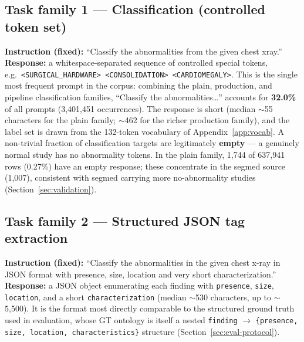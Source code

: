 \documentclass[11pt,a4paper]{article}
\begin{document}
\subsection{Task family 1 --- Classification (controlled token set)}
\textbf{Instruction (fixed):} ``Classify the abnormalities from the given chest xray.'' \textbf{Response:} a whitespace-separated sequence of controlled special tokens, e.g.\ \texttt{<SURGICAL\_HARDWARE> <CONSOLIDATION> <CARDIOMEGALY>}. This is the single most frequent prompt in the corpus: combining the plain, production, and pipeline classification families, ``Classify the abnormalities\dots'' accounts for \textbf{32.0\%} of all prompts (3{,}401{,}451 occurrences). The response is short (median $\sim$55 characters for the plain family; $\sim$462 for the richer production family), and the label set is drawn from the 132-token vocabulary of Appendix~\ref{app:vocab}. A non-trivial fraction of classification targets are legitimately \textbf{empty} --- a genuinely normal study has no abnormality tokens. In the plain family, 1{,}744 of 637{,}941 rows (0.27\%) have an empty response; these concentrate in the segmed source (1{,}007), consistent with segmed carrying more no-abnormality studies (Section~\ref{sec:validation}).

\subsection{Task family 2 --- Structured JSON tag extraction}
\textbf{Instruction (fixed):} ``Classify the abnormalities in the given chest x-ray in JSON format with presence, size, location and very short characterization.'' \textbf{Response:} a JSON object enumerating each finding with \texttt{presence}, \texttt{size}, \texttt{location}, and a short \texttt{characterization} (median $\sim$530 characters, up to $\sim$5{,}500). It is the format most directly comparable to the structured ground truth used in evaluation, whose GT ontology is itself a nested \texttt{finding} $\rightarrow$ \texttt{\{presence, size, location, characteristics\}} structure (Section~\ref{sec:eval-protocol}).
\end{document}
